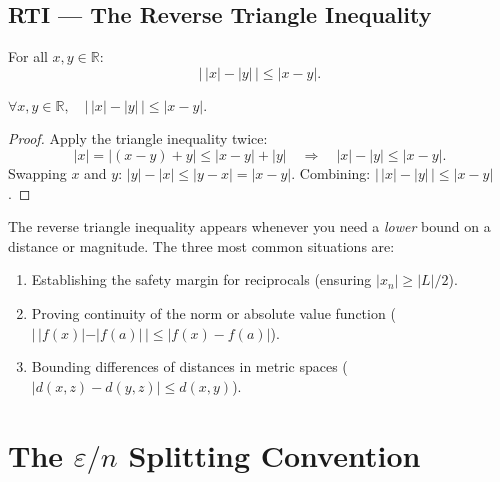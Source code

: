 \subsection{RTI — The Reverse Triangle Inequality}

\begin{tcolorbox}[colback=propbox, colframe=propborder, arc=2pt,
  left=8pt, right=8pt, top=6pt, bottom=6pt,
  title={\small\textbf{Proposition (Reverse Triangle Inequality)}},
  fonttitle=\small\bfseries]
For all $x, y \in \mathbb{R}$:
\[
  \bigl|\,|x| - |y|\,\bigr| \le |x - y|.
\]
\end{tcolorbox}

\begin{remark*}
$\forall x, y \in \mathbb{R},\quad \bigl|\,|x|-|y|\,\bigr| \le |x-y|$.
\end{remark*}

\begin{proof}
Apply the triangle inequality twice:
\[
  |x| = |(x - y) + y| \le |x-y| + |y|
  \quad\Rightarrow\quad
  |x| - |y| \le |x-y|.
\]
Swapping $x$ and $y$: $|y| - |x| \le |y - x| = |x - y|$.
Combining: $\bigl|\,|x|-|y|\,\bigr| \le |x-y|$.
\end{proof}

\begin{remark*}
The reverse triangle inequality appears whenever you need a
\emph{lower} bound on a distance or magnitude.
The three most common situations are:
\begin{enumerate}
  \item Establishing the safety margin for reciprocals
        (ensuring $|x_n| \ge |L|/2$).
  \item Proving continuity of the norm or absolute value function
        ($|\,|f(x)| - |f(a)|\,| \le |f(x) - f(a)|$).
  \item Bounding differences of distances in metric spaces
        ($|d(x,z) - d(y,z)| \le d(x,y)$).
\end{enumerate}
\end{remark*}

\clearpage


\section{The \texorpdfstring{$\varepsilon/n$}{Epsilon-over-n}
  Splitting Convention}
\label{sec:eps-splitting}


